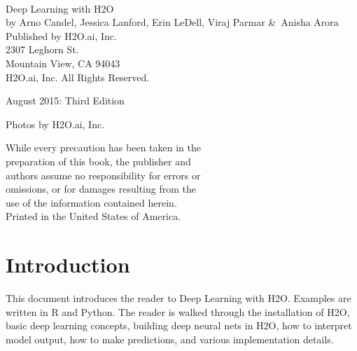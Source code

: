 {\raggedright\vfill\ 

Deep Learning with H2O\\
  by Arno Candel, Jessica Lanford, Erin LeDell, Viraj Parmar \&\ Anisha Arora\\
\bigskip
  Published by H2O.ai, Inc. \\
2307 Leghorn St. \\
Mountain View, CA 94043\\
\bigskip
{} H2O.ai, Inc. All Rights Reserved. 
\bigskip

August 2015: Third Edition
\bigskip

Photos by \textcopyright H2O.ai, Inc. 
\bigskip

While every precaution has been taken in the\\
preparation of this book, the publisher and\\
authors assume no responsibility for errors or\\
omissions, or for damages resulting from the\\
use of the information contained herein.\\
\bigskip
Printed in the United States of America. 
}

\newpage

\tableofcontents


\newpage

\section{Introduction}
This document introduces the reader to Deep Learning with H2O.  Examples are written in R and Python.
The reader is walked through the installation of H2O, basic deep learning concepts, building deep neural nets in H2O, how to interpret model output, how to make predictions, and various implementation details.





\newpage

